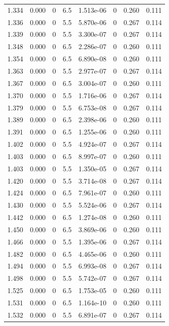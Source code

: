 \documentclass[preview]{standalone}
\begin{document}
{{{{\begin{tabular}{L{1.2cm}C{1.2cm} C{0.3cm}C{0.5cm} C{1.4cm}C{1.4cm} C{1.4cm}C{1.4cm}}
  1.334  &  0.000  & 0     & 6.5 &  1.513e-06  & 0  & 0.260 &  0.111   \\ 
  1.336  &  0.000  & 0     & 5.5 &  5.870e-06  & 0  & 0.267 &  0.114   \\ 
  1.339  &  0.000  & 0     & 5.5 &  3.300e-07  & 0  & 0.267 &  0.114   \\ 
  1.348  &  0.000  & 0     & 6.5 &  2.286e-07  & 0  & 0.260 &  0.111   \\ 
  1.354  &  0.000  & 0     & 6.5 &  6.890e-08  & 0  & 0.260 &  0.111   \\ 
  1.363  &  0.000  & 0     & 5.5 &  2.977e-07  & 0  & 0.267 &  0.114   \\ 
  1.367  &  0.000  & 0     & 6.5 &  3.004e-07  & 0  & 0.260 &  0.111   \\ 
  1.370  &  0.000  & 0     & 5.5 &  1.716e-06  & 0  & 0.267 &  0.114   \\ 
  1.379  &  0.000  & 0     & 5.5 &  6.753e-08  & 0  & 0.267 &  0.114   \\ 
  1.389  &  0.000  & 0     & 6.5 &  2.398e-06  & 0  & 0.260 &  0.111   \\ 
  1.391  &  0.000  & 0     & 6.5 &  1.255e-06  & 0  & 0.260 &  0.111   \\ 
  1.402  &  0.000  & 0     & 5.5 &  4.924e-07  & 0  & 0.267 &  0.114   \\ 
  1.403  &  0.000  & 0     & 6.5 &  8.997e-07  & 0  & 0.260 &  0.111   \\ 
  1.403  &  0.000  & 0     & 5.5 &  1.350e-05  & 0  & 0.267 &  0.114   \\ 
  1.420  &  0.000  & 0     & 5.5 &  3.714e-08  & 0  & 0.267 &  0.114   \\ 
  1.424  &  0.000  & 0     & 6.5 &  7.961e-07  & 0  & 0.260 &  0.111   \\ 
  1.430  &  0.000  & 0     & 5.5 &  5.524e-06  & 0  & 0.267 &  0.114   \\ 
  1.442  &  0.000  & 0     & 6.5 &  1.274e-08  & 0  & 0.260 &  0.111   \\ 
  1.450  &  0.000  & 0     & 6.5 &  3.869e-06  & 0  & 0.260 &  0.111   \\ 
  1.466  &  0.000  & 0     & 5.5 &  1.395e-06  & 0  & 0.267 &  0.114   \\ 
  1.482  &  0.000  & 0     & 6.5 &  4.465e-06  & 0  & 0.260 &  0.111   \\ 
  1.494  &  0.000  & 0     & 5.5 &  6.993e-08  & 0  & 0.267 &  0.114   \\ 
  1.498  &  0.000  & 0     & 5.5 &  5.742e-07  & 0  & 0.267 &  0.114   \\ 
  1.525  &  0.000  & 0     & 6.5 &  1.753e-05  & 0  & 0.260 &  0.111   \\ 
  1.531  &  0.000  & 0     & 6.5 &  1.164e-10  & 0  & 0.260 &  0.111   \\ 
  1.532  &  0.000  & 0     & 5.5 &  6.891e-07  & 0  & 0.267 &  0.114   \\ 
\hline 
\end{tabular} 

}}}}
\end{document}
